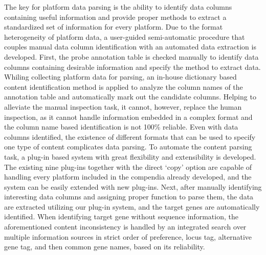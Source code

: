 The key for platform data parsing is the ability to identify data columns
containing useful information and provide proper methods to extract a
standardized set of information for every platform.
%
Due to the format heterogeneity of platform data, a user-guided semi-automatic
procedure that couples manual data column identification with an automated
data extraction is developed.
%
First, the probe annotation table is checked manually to identify data columns
containing desirable information and specify the method to extract data.
%
Whiling collecting platform data for parsing, an in-house dictionary based
content identification method is applied to analyze the column names of the
annotation table and automatically mark out the candidate columns.
%
Helping to alleviate the manual inspection task, it cannot, however, replace
the human inspection, as it cannot handle information embedded in a complex
format and the column name based identification is not 100\% reliable.
%
Even with data columns identified, the existence of different formats that
can be used to specify one type of content complicates data parsing.
To automate the content parsing task, a plug-in based system with great
flexibility and extensibility is developed.
%
The existing nine plug-ins together with the direct `copy' option are capable
of handling every platform included in the compendia already developed, and
the system can be easily extended with new plug-ins.
%
Next, after manually identifying interesting data columns and assigning proper
function to parse them, the data are extracted utilizing our plug-in system,
and the target genes are automatically identified.
%
When identifying target gene without sequence information, the aforementioned
content inconsistency is handled by an integrated search over multiple
information sources in strict order of preference, locus tag, alternative gene
tag, and then common gene names, based on its reliability.




